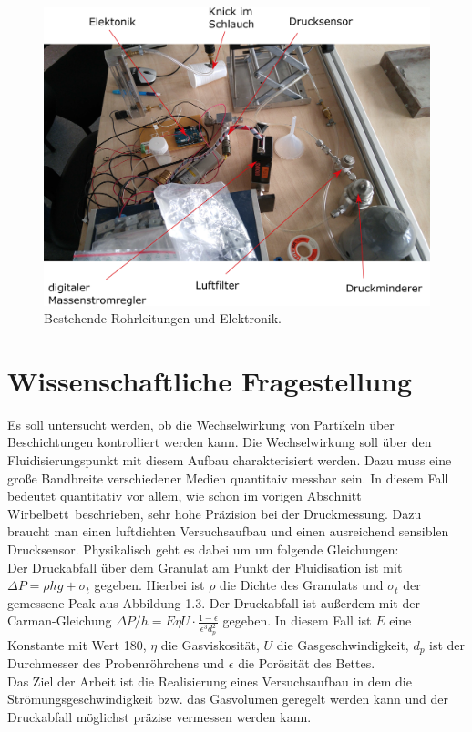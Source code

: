 \begin{figure}[h!]
	\begin{center}
		\includegraphics[scale=0.6]{Kabel_Rohrleitungen_alt.png}
		\caption[Bestehende Rohrleitungen und Elektronik]{Bestehende Rohrleitungen und Elektronik.}
	\end{center}
\end{figure}


\section{Wissenschaftliche Fragestellung}

Es soll untersucht werden, ob die Wechselwirkung von Partikeln über Beschichtungen kontrolliert werden kann. Die Wechselwirkung soll über den Fluidisierungspunkt mit diesem Aufbau charakterisiert werden. Dazu muss eine große Bandbreite verschiedener Medien quantitaiv messbar sein. In diesem Fall bedeutet quantitativ vor allem, wie schon im vorigen Abschnitt \glqq Wirbelbett\grqq \ beschrieben, sehr hohe Präzision bei der Druckmessung. Dazu braucht man einen luftdichten Versuchsaufbau und einen ausreichend sensiblen Drucksensor. Physikalisch geht es dabei um um folgende Gleichungen: \\
Der Druckabfall über dem Granulat am Punkt der Fluidisation ist mit $\Delta P = \rho h g + \sigma_t$ gegeben. Hierbei ist $\rho$ die Dichte des Granulats und $\sigma_t$ der gemessene Peak aus Abbildung 1.3. Der Druckabfall ist außerdem mit der Carman-Gleichung $\Delta P / h = E \eta U \cdot \frac{1 - \epsilon}{\epsilon^3 d_p^2}$ gegeben. In diesem Fall ist $E$ eine Konstante mit Wert 180, $\eta$ die Gasviskosität, $U$ die Gasgeschwindigkeit, $d_p$ ist der Durchmesser des Probenröhrchens und $\epsilon$ die Porösität des Bettes. \\
Das Ziel der Arbeit ist die Realisierung eines Versuchsaufbau in dem die Strömungsgeschwindigkeit bzw. das Gasvolumen geregelt werden kann und der Druckabfall möglichst präzise vermessen werden kann.


